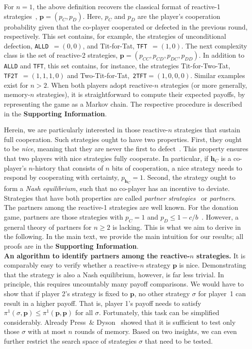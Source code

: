 \documentclass[11pt]{article}
\def\tft{\texttt{TFT}}
\def\tftt{\texttt{TF2T}}
\def\ttft{\texttt{2TFT}}
\def\alld{\texttt{ALLD}}
\def\SI{\textbf{Supporting Information}}
\begin{document}
For \(n\!=\!1\), the above definition recovers the classical format of reactive-1 strategies~\cite{sigmund2010}, \(\mathbf{p}\!=\!(p_C, p_D)\). 
Here, $p_C$ and $p_D$ are the player's cooperation probability given that the co-player cooperated or defected in the previous round, respectively. 
This set contains, for example, the strategies of unconditional defection, \alld~$=\!(0,0)$, and Tit-for-Tat, \tft~$=\!(1,0)$. 
The next complexity class is the set of reactive-2 strategies, $\mathbf{p}\!=\!(p_{CC},p_{CD},p_{DC},p_{DD})$.
In addition to \alld{} and \tft{}, this set contains, for instance, the strategies Tit-for-Two-Tat, \tftt~$=\!(1,1,1,0)$ and Two-Tit-for-Tat,~\ttft$=\!(1,0,0,0)$. 
Similar examples exist for $n\!>\!2$. 
When both players adopt reactive-$n$ strategies (or more generally, memory-$n$ strategies), it is straightforward to compute their expected payoffs, by representing the game as a Markov chain. 
The respective procedure is described in the \SI{}.  

Herein, we are particularly interested in those reactive-$n$ strategies that sustain full cooperation. 
Such strategies ought to have two properties. 
First, they ought to be {\it nice}, meaning that they are never the first to defect~\citep{axelrod:AAAS:1981}.
This property ensures that two players with nice strategies fully cooperate. 
In particular, if $\mathbf{h}_C$ is a co-player's $n$-history that consists of $n$ bits of cooperation, a nice strategy needs to respond by cooperating with certainty, $p_{\mathbf{h}_C}\!=\!1$.  
Second, the strategy ought to form a {\it Nash equilibrium}, such that no co-player has an incentive to deviate. 
Strategies that have both properties are called {\it partner strategies}~\citep{Hilbe:GEB:2015} or {\it partners}.
The partners among the reactive-1 strategies are well known. 
For the donation game, partners are those strategies with $p_C\!=\!1$ and $p_D\!\le\!1\!-\!c/b$~\citep{akin:EGADS:2016}. 
However, a general theory of partners for $n\!\ge\!2$ is lacking. 
This is what we aim to derive in the following. 
In the main text, we provide the main intuition for our results; all proofs are in the \SI.\\
 
 
 
 
\noindent
\textbf{An algorithm to identify partners among the reactive-$n$ strategies.} 
It is comparably easy to verify whether a reactive-$n$ strategy $\mathbf{p}$ is nice. 
Demonstrating that the strategy is also a Nash equilibrium, however, is far less trivial. 
In principle, this requires uncountably many payoff comparisons. 
We would have to show that if player 2's strategy is fixed to $\mathbf{p}$, no other strategy $\sigma$ for player~1 can result in a higher payoff. That is, player 1's payoff needs to satisfy $\pi^1(\sigma,\mathbf{p})\!\le\!\pi^1(\mathbf{p},\mathbf{p})$ for all $\sigma$. 
Fortunately, this task can be simplified considerably. 
Already Press~\& Dyson~\cite{press:PNAS:2012} showed that it is sufficient to test only those $\sigma$ with at most $n$ rounds of memory. 
Based on two insights, we can even further restrict the search space of strategies $\sigma$ that need to be tested.
\end{document}
